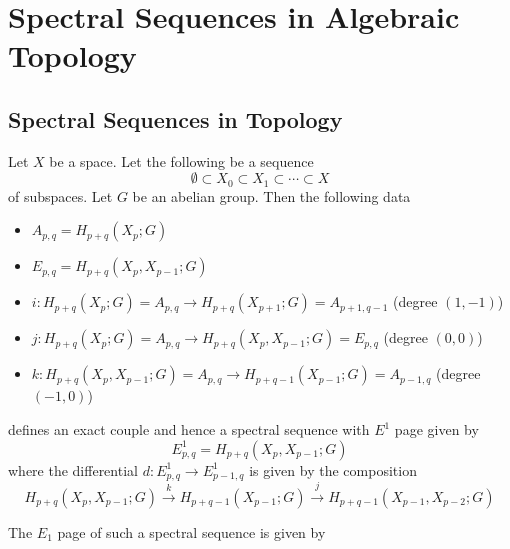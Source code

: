 \documentclass[a4paper]{article}
\begin{document}
\pagebreak
\section{Spectral Sequences in Algebraic Topology}
\subsection{Spectral Sequences in Topology}
\begin{thm}{}{} Let $X$ be a space. Let the following be a sequence $$\emptyset\subset X_0\subset X_1\subset\cdots\subset X$$ of subspaces. Let $G$ be an abelian group. Then the following data
\begin{itemize}
\item $A_{p,q}=H_{p+q}(X_p;G)$
\item $E_{p,q}=H_{p+q}(X_p,X_{p-1};G)$
\item $i:H_{p+q}(X_p;G)=A_{p,q}\to H_{p+q}(X_{p+1};G)=A_{p+1,q-1}$ (degree $(1,-1)$)
\item $j:H_{p+q}(X_p;G)=A_{p,q}\to H_{p+q}(X_p,X_{p-1};G)=E_{p,q}$ (degree $(0,0)$)
\item $k:H_{p+q}(X_p,X_{p-1};G)=A_{p,q}\to H_{p+q-1}(X_{p-1};G)=A_{p-1,q}$ (degree $(-1,0)$)
\end{itemize}
defines an exact couple and hence a spectral sequence with $E^1$ page given by $$E_{p,q}^1=H_{p+q}(X_p,X_{p-1};G)$$ where the differential $d:E_{p,q}^1\to E_{p-1,q}^1$ is given by the composition $$H_{p+q}(X_p,X_{p-1};G)\overset{k}{\longrightarrow}H_{p+q-1}(X_{p-1};G)\overset{j}{\longrightarrow} H_{p+q-1}(X_{p-1},X_{p-2};G)$$
\end{thm}

The $E_1$ page of such a spectral sequence is given by \\~\\
\\~\\
\end{document}
